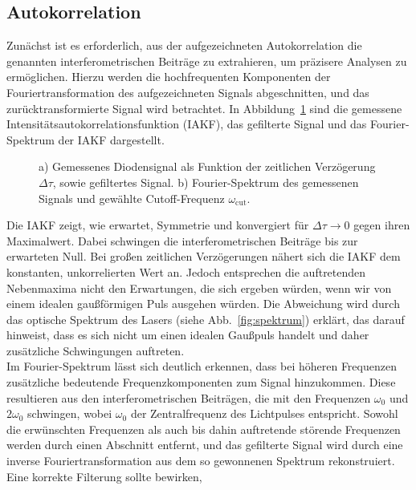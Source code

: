 \subsection{\label{sec:A1}Autokorrelation}
Zunächst ist es erforderlich, aus der aufgezeichneten Autokorrelation die genannten interferometrischen 
Beiträge zu extrahieren, um präzisere Analysen zu ermöglichen. Hierzu werden die hochfrequenten Komponenten 
der Fouriertransformation des aufgezeichneten Signals abgeschnitten, und das zurücktransformierte Signal wird 
betrachtet. In Abbildung~\ref{fig:A11} sind die gemessene Intensitätsautokorrelationsfunktion (IAKF), 
das gefilterte Signal und das Fourier-Spektrum der IAKF dargestellt.
\begin{figure}[h!]
    \centering
    \qquad
    \caption{\label{fig:A11}a) Gemessenes Diodensignal als Funktion der zeitlichen Verzögerung $\Delta\tau$,
    sowie gefiltertes Signal. b) Fourier-Spektrum des gemessenen Signals und gewählte 
    Cutoff-Frequenz $\omega_{\text{cut}}$.}
\end{figure}\FloatBarrier
Die IAKF zeigt, wie erwartet, Symmetrie und konvergiert für $\Delta\tau \rightarrow 0$ gegen ihren Maximalwert. 
Dabei schwingen die interferometrischen Beiträge bis zur erwarteten Null. 
Bei großen zeitlichen Verzögerungen nähert sich die IAKF dem konstanten, unkorrelierten Wert an. 
Jedoch entsprechen die auftretenden Nebenmaxima nicht den Erwartungen, die sich ergeben würden, 
wenn wir von einem idealen gaußförmigen Puls ausgehen würden. Die Abweichung wird durch das 
optische Spektrum des Lasers (siehe Abb.~\ref{fig:spektrum}) erklärt, das darauf hinweist, 
dass es sich nicht um einen idealen Gaußpuls handelt und daher zusätzliche Schwingungen auftreten. \\
Im Fourier-Spektrum lässt sich deutlich erkennen, dass bei höheren Frequenzen zusätzliche bedeutende 
Frequenzkomponenten zum Signal hinzukommen. Diese resultieren aus den interferometrischen Beiträgen, 
die mit den Frequenzen $\omega_{0}$ und $2\omega_{0}$ schwingen, wobei $\omega_{0}$ der Zentralfrequenz 
des Lichtpulses entspricht. Sowohl die erwünschten Frequenzen als auch bis dahin auftretende störende 
Frequenzen werden durch einen Abschnitt entfernt, und das gefilterte Signal wird durch eine inverse 
Fouriertransformation aus dem so gewonnenen Spektrum rekonstruiert. Eine korrekte Filterung sollte bewirken, 

